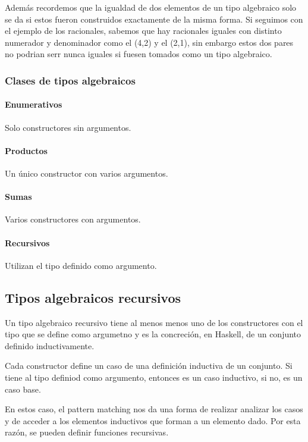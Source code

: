Además recordemos que la igualdad de dos elementos de un tipo algebraico solo se da si estos fueron construidos exactamente de la misma forma. Si seguimos con el ejemplo de los racionales, sabemos que hay racionales iguales con distinto numerador y denominador como el (4,2) y el (2,1), sin embargo estos dos pares no podrian serr nunca iguales si fuesen tomados como un tipo algebraico.

\subsubsection{Clases de tipos algebraicos}

\paragraph{Enumerativos} Solo constructores sin argumentos.

\paragraph{Productos} Un único constructor con varios argumentos.

\paragraph{Sumas} Varios constructores con argumentos.

\paragraph{Recursivos} Utilizan el tipo definido como argumento.

\subsection{Tipos algebraicos recursivos}
Un tipo algebraico recursivo tiene al menos menos uno de los constructores con el tipo que se define como argumetno y es la concreción, en Haskell, de un conjunto definido inductivamente.

Cada constructor define un caso de una definición inductiva de un conjunto. Si tiene al tipo definiod como argumento, entonces es un caso inductivo, si no, es un caso base.

En estos caso, el pattern matching nos da una forma de realizar analizar los casos y de acceder a los elementos inductivos que forman a un elemento dado. Por esta razón, se pueden definir funciones recursivas.

